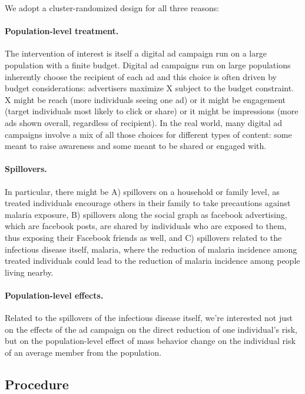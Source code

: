 \documentclass[a4paper,12pt]{article}
\begin{document}
\noindent We adopt a cluster-randomized design for all three reasons:

\paragraph{Population-level treatment.} The intervention of interest is itself a digital ad campaign run on a large population with a finite budget. Digital ad campaigns run on large populations inherently choose the recipient of each ad and this choice is often driven by budget considerations: advertisers maximize X subject to the budget constraint. X might be reach (more individuals seeing one ad) or it might be engagement (target individuals most likely to click or share) or it might be impressions (more ads shown overall, regardless of recipient). In the real world, many digital ad campaigns involve a mix of all those choices for different types of content: some meant to raise awareness and some meant to be shared or engaged with.


\paragraph{Spillovers.} In particular, there might be A) spillovers on a household or family level, as treated individuals encourage others in their family to take precautions against malaria exposure, B) spillovers along the social graph as facebook advertising, which are facebook posts, are shared by individuals who are exposed to them, thus exposing their Facebook friends as well, and C) spillovers related to the infectious disease itself, malaria, where the reduction of malaria incidence among treated individuals could lead to the reduction of malaria incidence among people living nearby.

\paragraph{Population-level effects.} Related to the spillovers of the infectious disease itself, we're interested not just on the effects of the ad campaign on the direct reduction of one individual's risk, but on the population-level effect of mass behavior change on the individual risk of an average member from the population.


\subsection{Procedure}
\end{document}
